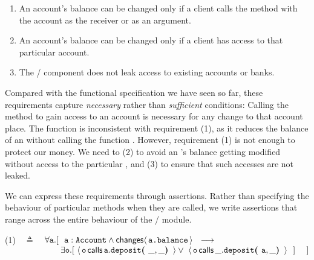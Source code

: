 \begin{enumerate}
\item 
An account's
  balance can be changed only  if a client   calls the  method  with the
  account as the receiver or as an argument. 
  \item An account's balance can be changed  only  if a client has
  access to that  particular account.  
\item The / component does not leak access to existing accounts or banks. 
 \end{enumerate}

Compared with the functional specification we have seen so far, these
requirements %
capture \emph{necessary} %
rather than
\emph{sufficient} conditions:  Calling the 
method to gain access to an account %
is necessary for any change to that account  place.
The  function 
 is inconsistent with requirement  (1), as it reduces the balance of an  without calling the
function . 
However, requirement  (1) is not enough to protect our money. We need to (2) to avoid an 's balance getting
modified without access to the particular , and (3) to ensure that such accesses are not leaked. 


 
We can  express these  requirements  %
through \Chainmail assertions.  Rather than %
specifying the behaviour of particular methods when they are called, we
write  assertions   that range across the entire behaviour of the
/  module.%
\vspace{.2cm}

(1)\ \  $\triangleq$\ \ $\forall \prg{a}.[\ \ \prg{a}:\prg{Account} \wedge \Changes{\prg{a.balance}}  \ \    
    \longrightarrow \ \    \hfill$ \\
  $\strut \hspace{2.3cm} 
  \exists \prg{o}. [\    \Calls{\prg{o}}{\prg{deposit}}{\prg{a}}{\_,\_} \vee\  \Calls{\prg{o}}{\prg{deposit}}{\_}{\prg{a},\_}\  \ ] \ \ \ \ ] \hfill $

